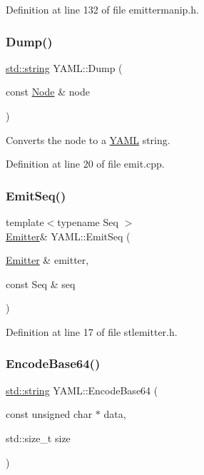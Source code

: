 Definition at line 132 of file emittermanip.\+h.

\mbox{\label{namespace_y_a_m_l_a0d9a7de301ca30dfadbc7fca2460f623}} 
\subsubsection{\texorpdfstring{Dump()}{Dump()}}
{\footnotesize\ttfamily \mbox{\hyperlink{glad_8h_ac83513893df92266f79a515488701770}{std\+::string}} Y\+A\+M\+L\+::\+Dump (\begin{DoxyParamCaption}\item[{const \mbox{\hyperlink{class_y_a_m_l_1_1_node}{Node}} \&}]{node }\end{DoxyParamCaption})}

Converts the node to a \mbox{\hyperlink{namespace_y_a_m_l}{Y\+A\+ML}} string. 

Definition at line 20 of file emit.\+cpp.

\mbox{\label{namespace_y_a_m_l_a743b83b17fbbadcae7358c7aaa17a2e3}} 
\subsubsection{\texorpdfstring{EmitSeq()}{EmitSeq()}}
{\footnotesize\ttfamily template$<$typename Seq $>$ \\
\mbox{\hyperlink{class_y_a_m_l_1_1_emitter}{Emitter}}\& Y\+A\+M\+L\+::\+Emit\+Seq (\begin{DoxyParamCaption}\item[{\mbox{\hyperlink{class_y_a_m_l_1_1_emitter}{Emitter}} \&}]{emitter,  }\item[{const Seq \&}]{seq }\end{DoxyParamCaption})\hspace{0.3cm}{\ttfamily [inline]}}



Definition at line 17 of file stlemitter.\+h.

\mbox{\label{namespace_y_a_m_l_a6374754e4efbcb1c4677b3c73d8ff19a}} 
\subsubsection{\texorpdfstring{EncodeBase64()}{EncodeBase64()}}
{\footnotesize\ttfamily \mbox{\hyperlink{glad_8h_ac83513893df92266f79a515488701770}{std\+::string}} Y\+A\+M\+L\+::\+Encode\+Base64 (\begin{DoxyParamCaption}\item[{const unsigned char $\ast$}]{data,  }\item[{std\+::size\+\_\+t}]{size }\end{DoxyParamCaption})}



